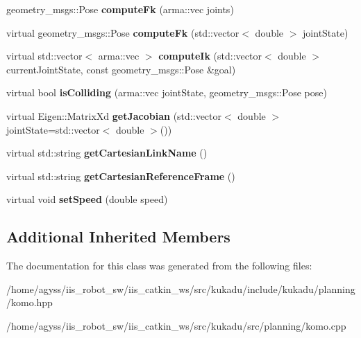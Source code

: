 \begin{DoxyCompactItemize}
\item 
geometry\+\_\+msgs\+::\+Pose {\bfseries compute\+Fk} (arma\+::vec joints)\hypertarget{classkukadu_1_1Komo_a34827d5919ab2c771fab7a53d83006c7}{}\label{classkukadu_1_1Komo_a34827d5919ab2c771fab7a53d83006c7}

\item 
virtual geometry\+\_\+msgs\+::\+Pose {\bfseries compute\+Fk} (std\+::vector$<$ double $>$ joint\+State)\hypertarget{classkukadu_1_1Komo_a9081baf7213db3e0c6d903d8d5f81d8f}{}\label{classkukadu_1_1Komo_a9081baf7213db3e0c6d903d8d5f81d8f}

\item 
virtual std\+::vector$<$ arma\+::vec $>$ {\bfseries compute\+Ik} (std\+::vector$<$ double $>$ current\+Joint\+State, const geometry\+\_\+msgs\+::\+Pose \&goal)\hypertarget{classkukadu_1_1Komo_ac5024e3bd49c0a741640e35bf841f0bd}{}\label{classkukadu_1_1Komo_ac5024e3bd49c0a741640e35bf841f0bd}

\item 
virtual bool {\bfseries is\+Colliding} (arma\+::vec joint\+State, geometry\+\_\+msgs\+::\+Pose pose)\hypertarget{classkukadu_1_1Komo_afd21f2d6c4046379ffd93d8bd228f5a1}{}\label{classkukadu_1_1Komo_afd21f2d6c4046379ffd93d8bd228f5a1}

\item 
virtual Eigen\+::\+Matrix\+Xd {\bfseries get\+Jacobian} (std\+::vector$<$ double $>$ joint\+State=std\+::vector$<$ double $>$())\hypertarget{classkukadu_1_1Komo_af92fedee721583ea9a44ce147e537991}{}\label{classkukadu_1_1Komo_af92fedee721583ea9a44ce147e537991}

\item 
virtual std\+::string {\bfseries get\+Cartesian\+Link\+Name} ()\hypertarget{classkukadu_1_1Komo_af0bc25dedd4a41275de5fddc3fb4d7af}{}\label{classkukadu_1_1Komo_af0bc25dedd4a41275de5fddc3fb4d7af}

\item 
virtual std\+::string {\bfseries get\+Cartesian\+Reference\+Frame} ()\hypertarget{classkukadu_1_1Komo_ac8b1d5695e865adc313937da5eab629a}{}\label{classkukadu_1_1Komo_ac8b1d5695e865adc313937da5eab629a}

\item 
virtual void {\bfseries set\+Speed} (double speed)\hypertarget{classkukadu_1_1Komo_abb008bb3e79d95c831e8924c53bfe5c9}{}\label{classkukadu_1_1Komo_abb008bb3e79d95c831e8924c53bfe5c9}

\end{DoxyCompactItemize}
\subsection*{Additional Inherited Members}


The documentation for this class was generated from the following files\+:\begin{DoxyCompactItemize}
\item 
/home/agyss/iis\+\_\+robot\+\_\+sw/iis\+\_\+catkin\+\_\+ws/src/kukadu/include/kukadu/planning/komo.\+hpp\item 
/home/agyss/iis\+\_\+robot\+\_\+sw/iis\+\_\+catkin\+\_\+ws/src/kukadu/src/planning/komo.\+cpp\end{DoxyCompactItemize}
